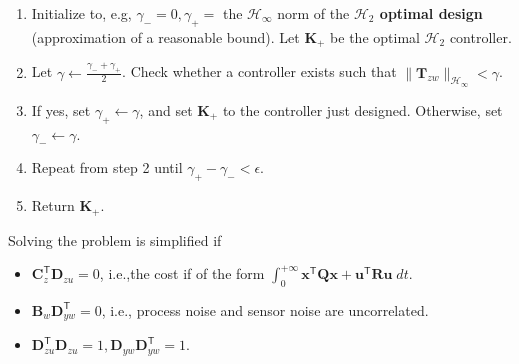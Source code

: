 \newpar{}

\begin{enumerate}
    \item Initialize to, e.g, $\gamma_-=0,\gamma_+=$ the $\mathcal{H}_\infty$ norm of the \textbf{$\mathcal{H}_2$ optimal design} (approximation of a reasonable bound). Let $\mathbf{K}_+$ be the optimal $\mathcal{H}_2$ controller.
    \item Let $\gamma\gets \frac{\gamma_-+\gamma_+}{2}$. Check whether a controller exists such that $\|\mathbf{T}_{zw}\|_{\mathcal{H}_\infty}<\gamma$.
    \item If yes, set $\gamma_+\leftarrow\gamma$, and set $\mathbf{K}_+$ to the controller just designed. Otherwise, set $\gamma_-\leftarrow\gamma$.
    \item Repeat from step 2 until $\gamma_+-\gamma_-<\epsilon$.
    \item Return $\mathbf{K}_+$.
\end{enumerate}

\newpar{}

Solving the problem is simplified if
\begin{itemize}
    \item $\mathbf{C}_{z}^{\mathsf{T}}\mathbf{D}_{zu}=0$, i.e.,the cost if of the form $\int_0^{+\infty}\mathbf{x}^{\mathsf{T}}\mathbf{Q}\mathbf{x}+\mathbf{u}^{\mathsf{T}}\mathbf{R}\mathbf{u}\;dt$.
    \item $\mathbf{B}_w \mathbf{D}_{yw}^{\mathsf{T}}=0$, i.e., process noise and sensor noise are uncorrelated.
    \item $\mathbf{D}_{zu}^{\mathsf{T}}\mathbf{D}_{zu}=1,\mathbf{D}_{yw}\mathbf{D}_{yw}^{\mathsf{T}}=1$.
\end{itemize}

